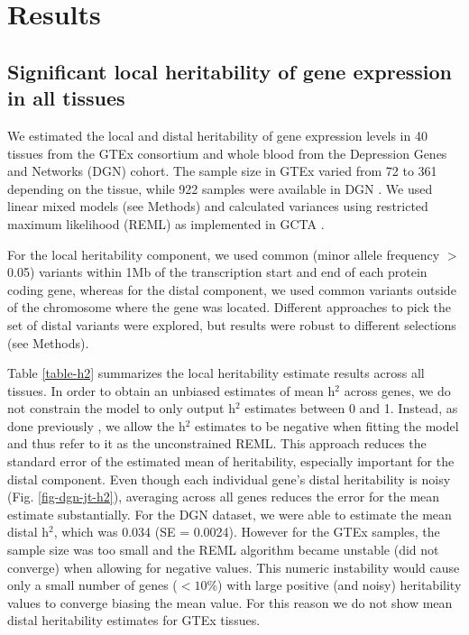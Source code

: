 \documentclass[10pt,letterpaper]{article}
\begin{document}
\section*{Results}
\subsection*{Significant local heritability of gene expression in all tissues}\label{local-genetic-variation-can-be-well-characterized-for-all-tissues}

We estimated the local and distal heritability of gene expression levels in 40 tissues from the GTEx consortium and whole blood from the Depression Genes and Networks (DGN) cohort. The sample size in GTEx varied from 72 to 361 depending on the tissue, while 922 samples were available in DGN \cite{Battle_2013}. We used linear mixed models (see Methods) and calculated variances using restricted maximum likelihood (REML) as implemented in GCTA \cite{Yang_2011}.

For the local heritability component, we used common (minor allele frequency $>$ 0.05) variants within 1Mb of the transcription start and end of each protein coding gene, whereas for the distal component, we used common variants outside of the chromosome where the gene was located. Different approaches to pick the set of distal variants were explored, but results were robust to different selections (see Methods).

Table \ref{table-h2} summarizes the local heritability estimate results across all tissues. In order to obtain an unbiased estimates of mean h$^2$ across genes, we do not constrain the model to only output h$^2$ estimates between 0 and 1. Instead, as done previously \cite{Price_2011,Wright_2014}, we allow the h$^2$ estimates to be negative when fitting the model and thus refer to it as the unconstrained REML. This approach reduces the standard error of the estimated mean of heritability, especially important for the distal component. Even though each individual gene's distal heritability is noisy (Fig. \ref{fig-dgn-jt-h2}), averaging across all genes reduces the error for the mean estimate substantially. For the DGN dataset, we were able to estimate the mean distal h$^2$, which was 0.034 (SE = 0.0024). However for the GTEx samples, the sample size was too small and the REML algorithm became unstable (did not converge) when allowing for negative values. This numeric instability would cause only a small number of genes ($<10$\%) with large positive (and noisy) heritability values to converge biasing the mean value. For this reason we do not show mean distal heritability estimates for GTEx tissues. 
\end{document}
